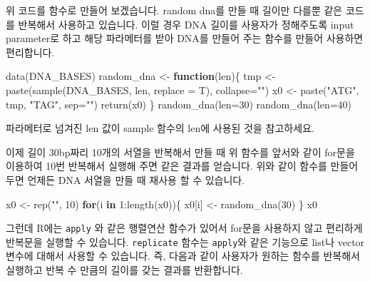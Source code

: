 \documentclass[
]{book}
\newenvironment{Shaded}{\begin{snugshade}}{\end{snugshade}}
\newcommand{\AttributeTok}[1]{\textcolor[rgb]{0.77,0.63,0.00}{#1}}
\newcommand{\ControlFlowTok}[1]{\textcolor[rgb]{0.13,0.29,0.53}{\textbf{#1}}}
\newcommand{\DecValTok}[1]{\textcolor[rgb]{0.00,0.00,0.81}{#1}}
\newcommand{\FunctionTok}[1]{\textcolor[rgb]{0.00,0.00,0.00}{#1}}
\newcommand{\NormalTok}[1]{#1}
\newcommand{\OtherTok}[1]{\textcolor[rgb]{0.56,0.35,0.01}{#1}}
\newcommand{\SpecialCharTok}[1]{\textcolor[rgb]{0.00,0.00,0.00}{#1}}
\newcommand{\StringTok}[1]{\textcolor[rgb]{0.31,0.60,0.02}{#1}}
\begin{document}
위 코드를 함수로 만들어 보겠습니다. random dna를 만들 때 길이만 다를뿐 같은 코드를 반복해서 사용하고 있습니다. 이럴 경우 DNA 길이를 사용자가 정해주도록 input parameter로 하고 해당 파라메터를 받아 DNA를 만들어 주는 함수를 만들어 사용하면 편리합니다.

\begin{Shaded}
\begin{Highlighting}[]
\FunctionTok{data}\NormalTok{(DNA\_BASES)}
\NormalTok{random\_dna }\OtherTok{\textless{}{-}} \ControlFlowTok{function}\NormalTok{(len)\{}
\NormalTok{  tmp }\OtherTok{\textless{}{-}} \FunctionTok{paste}\NormalTok{(}\FunctionTok{sample}\NormalTok{(DNA\_BASES, len, }\AttributeTok{replace =}\NormalTok{ T), }\AttributeTok{collapse=}\StringTok{""}\NormalTok{)}
\NormalTok{  x0 }\OtherTok{\textless{}{-}} \FunctionTok{paste}\NormalTok{(}\StringTok{"ATG"}\NormalTok{, tmp, }\StringTok{"TAG"}\NormalTok{, }\AttributeTok{sep=}\StringTok{""}\NormalTok{)}
  \FunctionTok{return}\NormalTok{(x0)}
\NormalTok{\}}
\FunctionTok{random\_dna}\NormalTok{(}\AttributeTok{len=}\DecValTok{30}\NormalTok{)}
\FunctionTok{random\_dna}\NormalTok{(}\AttributeTok{len=}\DecValTok{40}\NormalTok{)}
\end{Highlighting}
\end{Shaded}

파라메터로 넘겨진 len 값이 sample 함수의 len에 사용된 것을 참고하세요.

이제 길이 30bp짜리 10개의 서열을 반복해서 만들 때 위 함수를 앞서와 같이 for문을 이용하여 10번 반복해서 실행해 주면 같은 결과를 얻습니다. 위와 같이 함수를 만들어 두면 언제든 DNA 서열을 만들 때 재사용 할 수 있습니다.

\begin{Shaded}
\begin{Highlighting}[]
\NormalTok{x0 }\OtherTok{\textless{}{-}} \FunctionTok{rep}\NormalTok{(}\StringTok{""}\NormalTok{, }\DecValTok{10}\NormalTok{)}
\ControlFlowTok{for}\NormalTok{(i }\ControlFlowTok{in} \DecValTok{1}\SpecialCharTok{:}\FunctionTok{length}\NormalTok{(x0))\{}
\NormalTok{  x0[i] }\OtherTok{\textless{}{-}} \FunctionTok{random\_dna}\NormalTok{(}\DecValTok{30}\NormalTok{)}
\NormalTok{\}}
\NormalTok{x0}
\end{Highlighting}
\end{Shaded}

그런데 R에는 \texttt{apply} 와 같은 행렬연산 함수가 있어서 for문을 사용하지 않고 편리하게 반복문을 실행할 수 있습니다. \texttt{replicate} 함수는 \texttt{apply}와 같은 기능으로 list나 vector 변수에 대해서 사용할 수 있습니다. 즉, 다음과 같이 사용자가 원하는 함수를 반복해서 실행하고 반복 수 만큼의 길이를 갖는 결과를 반환합니다.
\end{document}
